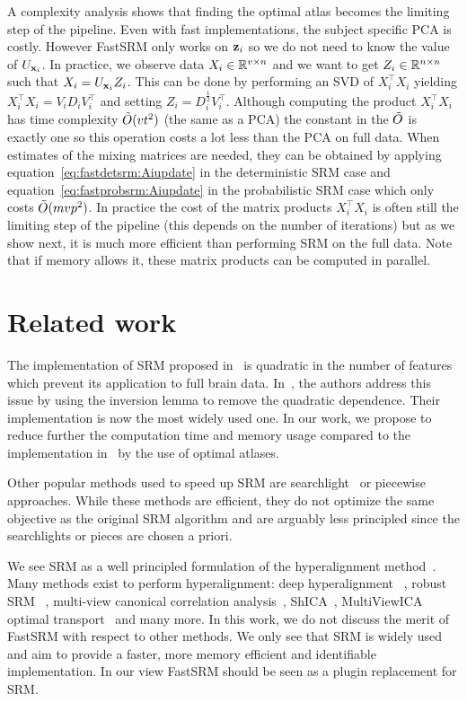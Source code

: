 \documentclass{article}
\begin{document}
A complexity analysis shows that finding the optimal atlas becomes the limiting
step of the pipeline.
%
Even with fast implementations, the subject specific PCA
is costly.
%
However FastSRM only works on $\mathbf{z}_i$ so we do not need to know the value of
$U_{\mathbf{x}_i}$.
%
In practice, we observe data $X_i \in \mathbb{R}^{v \times n}$ and we want to get $Z_i
\in \mathbb{R}^{n \times n}$ such that $X_i = U_{\mathbf{x}_i} Z_i$.
%
This can be done by performing an
SVD of $X_i^{\top} X_i$ yielding $X_i^{\top}X_i= V_i D_i V_i^{\top}$ and setting
$Z_i = D_i^{\frac12} V_i^{\top}$.
%
Although computing the product $X_i^{\top} X_i$ has time complexity
$\tilde{O}(vt^2)$ (the same as a PCA) the constant in the $\tilde{O}$ is exactly one so
this operation costs a lot less than the PCA
on full data.
%
When estimates of the mixing matrices are needed, they can be obtained by
applying equation~\eqref{eq:fastdetsrm:Aiupdate} in the deterministic SRM case and
equation~\eqref{eq:fastprobsrm:Aiupdate} in the probabilistic SRM case which only costs
$\tilde{O}(mvp^2)$.
%
In practice the cost of the matrix products $X_i^{\top} X_i$ is often still the
limiting step of the pipeline (this depends on the number of iterations) but as
we show next, it is much more efficient than performing SRM on
the full data.
%
Note that if memory allows it, these matrix products can be
computed in parallel.
%

\section{Related work}
The implementation of SRM proposed in~\cite{chen2015reduced} is quadratic in the
number of features which prevent its application to full brain data.
In~\cite{anderson2016enabling}, the authors address this issue by using the
inversion lemma to remove the quadratic dependence. Their implementation is now the most widely used one.
In our work, we propose to reduce further the computation time and memory usage
compared to the implementation in~\cite{anderson2016enabling} by the use of
optimal atlases.

Other popular methods used to speed up SRM are searchlight~\cite{zhang2016searchlight} or piecewise~\cite{bazeille2021empirical}
approaches. While these methods are efficient, they do not optimize the same
objective as the original SRM algorithm and are arguably less principled since the
searchlights or pieces are chosen a priori.

We see SRM as a well principled formulation of the hyperalignment
method~\cite{haxby2011common}.
%
Many methods exist to perform hyperalignment: deep
hyperalignment~\cite{yousefnezhad2017deep} , robust
SRM~\cite{turek2018capturing} , multi-view canonical correlation
analysis~\cite{li2009joint}, ShICA~\cite{richard2021model},
MultiViewICA~\cite{richard2020modeling} optimal
transport~\cite{bazeille2019local} and many more.
%
In this work, we do not discuss the merit of FastSRM with respect to
other methods. We only see that SRM is widely used and aim to provide
a faster, more memory efficient and identifiable implementation.  In
our view FastSRM should be seen as a plugin replacement for SRM.
\end{document}
